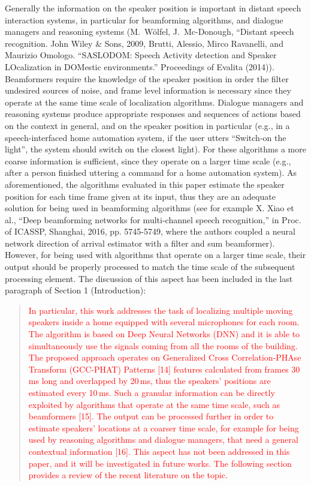 \documentclass[11pt, technote, letterpaper, oneside, onecolumn]{IEEEtran}
\begin{document}
\begin{enumerate}
Generally the information on the speaker position is important in distant speech interaction systems, in particular for beamforming algorithms, and dialogue managers and reasoning systems (M.\ W\"olfel, J.\ Mc-Donough, ``Distant speech recognition. John Wiley \& Sons, 2009, Brutti, Alessio, Mirco Ravanelli, and Maurizio Omologo. ``SASLODOM: Speech Activity detection and Speaker LOcalization in DOMestic environments.'' Proceedings of Evalita (2014)). Beamformers require the knowledge of the speaker position in order the filter undesired sources of noise, and frame level information is necessary since they operate at the same time scale of localization algorithms. Dialogue managers and reasoning systems produce appropriate responses and sequences of actions based on the context in general, and on the speaker position in particular (e.g., in a speech-interfaced home automation system, if the user utters ``Switch-on the light'', the system should switch on the closest light).  For these algorithms a more coarse information is sufficient, since they operate on a larger time scale (e.g., after a person finished uttering a command for a home automation system). As aforementioned, the algorithms evaluated in this paper estimate the speaker position for each time frame given at its input, thus they are an adequate solution for being used in beamforming algorithms (see for example X. Xiao et al., ``Deep beamforming networks for multi-channel speech recognition,'' in Proc. of ICASSP, Shanghai, 2016, pp. 5745-5749, where the authors coupled a neural network direction of arrival estimator with a filter and sum beamformer). However, for being used with algorithms that operate on a larger time scale, their output should be properly processed to match the time scale of the subsequent processing element. 
The discussion of this aspect has been included in the last paragraph of Section 1 (Introduction):
\begin{quote}
\textcolor{red} {
In particular, this work addresses the task of localizing multiple moving speakers inside a home equipped with several microphones for each room. The algorithm is based on Deep Neural Networks (DNN) and it is able to simultaneously use the signals coming from all the rooms of the building. The proposed approach operates on Generalized Cross Correlation-PHAse Transform (GCC-PHAT) Patterns [14] features calculated from frames 30\,ms long and overlapped by 20\,ms, thus the speakers' positions are estimated every 10\,ms. Such a granular information can be directly exploited by algorithms that operate at the same time scale, such as beamformers [15]. The output can be processed further in order to estimate speakers' locations at a coarser time scale, for example for being used by reasoning algorithms and dialogue managers, that need a general contextual information [16]. This aspect has not been addressed in this paper, and it will be investigated in future works. The following section provides a review of the recent literature on the topic.
}
\end{quote}


\end{enumerate}
\end{document}
